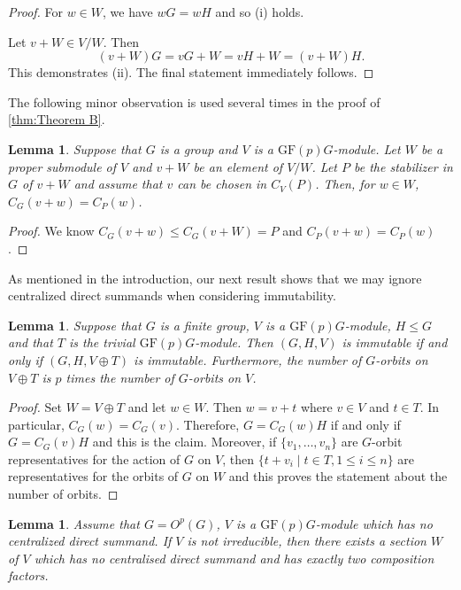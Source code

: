 \documentclass[12pt]{amsart}
\newtheorem{lemma}[theorem]{Lemma}
\theoremstyle{remark}
\theoremstyle{notation}
\theoremstyle{definition}
\newcommand{\GF}{\mathrm{GF}}
\newcommand{\0}{\emptyset}
\begin{document}
\begin{proof}
For $w \in W$, we have $w G= w H$ and so (i) holds.

Let $v+ W \in V/W$.  Then $$(v+W) G= v G+W=v H+W=(v+W) H.$$ This demonstrates (ii). The final statement immediately follows.
\end{proof}

The following minor observation is used several times in the proof of \cref{thm:Theorem B}.

\begin{lemma}\label{lem:vec stabiliser}
Suppose that $G$ is a group and $V$ is a $\GF(p)G$-module.
Let $W$ be a proper  submodule of $V$ and $v+W$ be an element of $V/W$. Let $P$ be the stabilizer in $G$ of $v+W$ and assume that $v$ can be chosen in $C_V(P)$. Then, for $w \in W$, $C_G(v+w)=C_P(w)$.
\end{lemma}

\begin{proof} We  know  $C_G(v+w) \le C_G(v+W)= P$ and $C_P(v+w)= C_P(w)$.
\end{proof}


As mentioned in the introduction, our next result shows that we may ignore centralized direct summands when considering immutability.

\begin{lemma}\label{lem:trivial factors} Suppose that $G$ is a finite group, $V$ is a $\GF(p)G$-module, $H\le G$ and that $T$ is the trivial $\GF(p)G$-module. Then $(G,H,V)$ is immutable if and only if $(G,H,V\oplus T)$ is immutable. Furthermore, the number of $G$-orbits on $V\oplus T$ is $p$ times the number of $G$-orbits on $V$. \end{lemma}

\begin{proof} Set $W= V \oplus T$ and let $w \in W$. Then $w=v+t$ where $v \in V$ and $t\in T$. In particular, $C_G(w)= C_G(v)$. Therefore, $G= C_G(w)H$ if and only if $G=C_G(v)H$ and this is the claim. Moreover, if  $\{v_1, \dots, v_n\}$ are $G$-orbit representatives for the action of $G$ on $V$, then $\{t+v_i\mid t \in T, 1\le i\le n\}$ are representatives for the orbits of $G$ on $W$ and this proves the statement about the number of orbits.
\end{proof}








 \begin{lemma}\label{lem:min exactly 2}
 Assume that $G= O^p(G)$, $V$ is a $\GF(p)G$-module which   has no centralized direct summand.  If $V$ is not irreducible, then there exists a section $W$ of $V$ which   has no centralised direct summand and has exactly two composition factors.
 \end{lemma}
\end{document}
